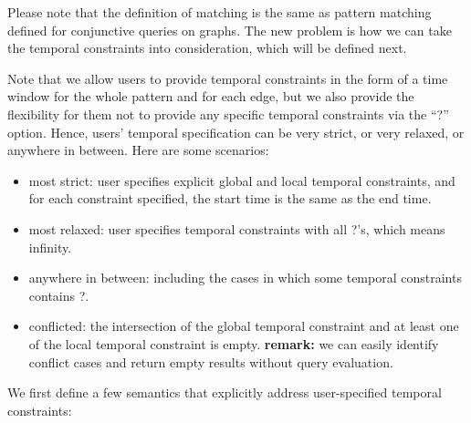 Please note that the definition of matching is the same as pattern matching
defined for conjunctive queries on graphs. The new problem is how we can take the
temporal constraints into consideration, which will be defined next.

Note that we allow users to provide temporal constraints in the form of a time
window for the whole pattern and for each edge, but we also provide the
flexibility for them not to provide any specific temporal constraints via the
``?'' option. Hence, users' temporal specification can be very strict, or very
relaxed, or anywhere in between. Here are some scenarios:

\begin{itemize}
        \item most strict: user specifies explicit global and local temporal
          constraints, and for each constraint specified, the start time is the
          same as the end time.
	\item most relaxed: user specifies temporal constraints with all ?'s, which means infinity.
	\item anywhere in between: including the cases in which some temporal constraints contains ?. 
        \item conflicted: the intersection of the global temporal constraint and
          at least one of the local temporal constraint is empty. {\bf remark:}
          we can easily identify conflict cases and return empty results without
          query evaluation.
\end{itemize}

We first define a few semantics that explicitly address user-specified temporal
constraints:

